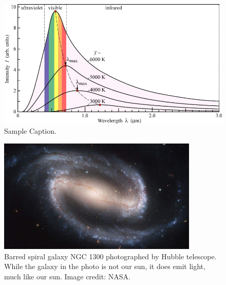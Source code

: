 \begin{refsection}
\begin{rotatepage}
\begin{figure}
    \centering
    \includegraphics[width=\textwidth]{figures/sampleFig2.png}
    \caption{Sample Caption.}
    \label{FigureLabel}
\end{figure}
\end{rotatepage}

\begin{figure}[ht]
    \centering
	\includegraphics[width=0.85\textwidth]{figures/sampleFig1.jpg} 
	\caption[Barred spiral galaxy NGC 1300]{Barred spiral galaxy NGC 1300 photographed by Hubble telescope. While the galaxy in the photo is not our sun, it does emit light, much like our sun. Image credit: NASA.}
	\label{fig:firstFig}
\end{figure}



\clearpage

\printbibliography[heading=subbibintoc, title={\centering Notes}]
\end{refsection}